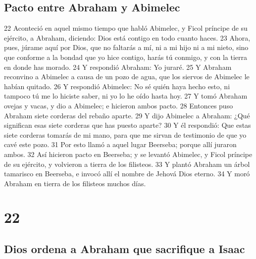 \section{Pacto entre Abraham y Abimelec}

22 Aconteció en aquel mismo tiempo que habló Abimelec, y Ficol príncipe de su ejército, a Abraham, diciendo: Dios está contigo en todo cuanto haces.
23 Ahora, pues, júrame aquí por Dios, que no faltarás a mí, ni a mi hijo ni a mi nieto, sino que conforme a la bondad que yo hice contigo, harás tú conmigo, y con la tierra en donde has morado.
24 Y respondió Abraham: Yo juraré.
25 Y Abraham reconvino a Abimelec a causa de un pozo de agua, que los siervos de Abimelec le habían quitado.
26 Y respondió Abimelec: No sé quién haya hecho esto, ni tampoco tú me lo hiciste saber, ni yo lo he oído hasta hoy.
27 Y tomó Abraham ovejas y vacas, y dio a Abimelec; e hicieron ambos pacto.
28 Entonces puso Abraham siete corderas del rebaño aparte.
29 Y dijo Abimelec a Abraham: ¿Qué significan esas siete corderas que has puesto aparte?
30 Y él respondió: Que estas siete corderas tomarás de mi mano, para que me sirvan de testimonio de que yo cavé este pozo.
31 Por esto llamó a aquel lugar Beerseba; porque allí juraron ambos.
32 Así hicieron pacto en Beerseba; y se levantó Abimelec, y Ficol príncipe de su ejército, y volvieron a tierra de los filisteos.
33 Y plantó Abraham un árbol tamarisco en Beerseba, e invocó allí el nombre de Jehová Dios eterno.
34 Y moró Abraham en tierra de los filisteos muchos días.

\chapter{22}

\section{Dios ordena a Abraham que sacrifique a Isaac}

